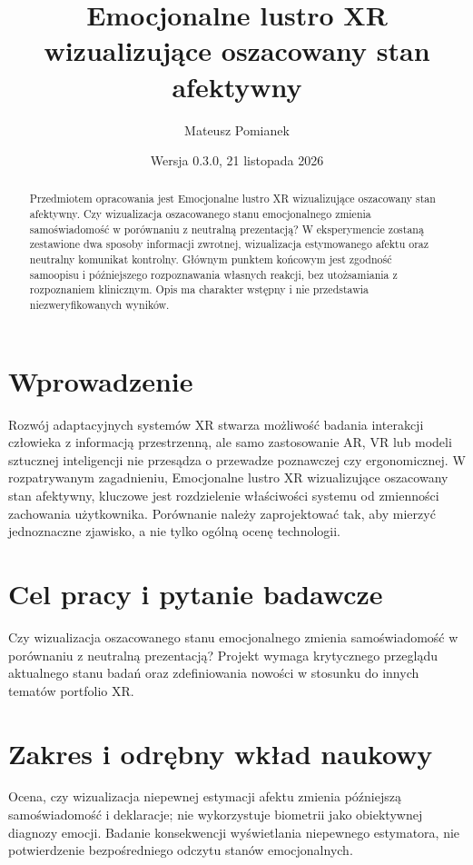 \documentclass[11pt,a4paper]{article}
\title{Emocjonalne lustro XR wizualizujące oszacowany stan afektywny}
\author{Mateusz Pomianek}
\date{Wersja 0.3.0, 21 listopada 2026}
\begin{document}
\maketitle

\begin{abstract}

Przedmiotem opracowania jest Emocjonalne lustro XR wizualizujące oszacowany stan afektywny. Czy wizualizacja oszacowanego stanu emocjonalnego zmienia samoświadomość w porównaniu z neutralną prezentacją? W eksperymencie zostaną zestawione dwa sposoby informacji zwrotnej, wizualizacja estymowanego afektu oraz neutralny komunikat kontrolny. Głównym punktem końcowym jest zgodność samoopisu i późniejszego rozpoznawania własnych reakcji, bez utożsamiania z rozpoznaniem klinicznym. Opis ma charakter wstępny i nie przedstawia niezweryfikowanych wyników.

\end{abstract}

\section{Wprowadzenie}

Rozwój adaptacyjnych systemów XR stwarza możliwość badania interakcji człowieka z informacją przestrzenną, ale samo zastosowanie AR, VR lub modeli sztucznej inteligencji nie przesądza o przewadze poznawczej czy ergonomicznej. W rozpatrywanym zagadnieniu, Emocjonalne lustro XR wizualizujące oszacowany stan afektywny, kluczowe jest rozdzielenie właściwości systemu od zmienności zachowania użytkownika. Porównanie należy zaprojektować tak, aby mierzyć jednoznaczne zjawisko, a nie tylko ogólną ocenę technologii.

\section{Cel pracy i pytanie badawcze}

Czy wizualizacja oszacowanego stanu emocjonalnego zmienia samoświadomość w porównaniu z neutralną prezentacją? Projekt wymaga krytycznego przeglądu aktualnego stanu badań oraz zdefiniowania nowości w stosunku do innych tematów portfolio XR.

\section{Zakres i odrębny wkład naukowy}
Ocena, czy wizualizacja niepewnej estymacji afektu zmienia późniejszą samoświadomość i deklaracje; nie wykorzystuje biometrii jako obiektywnej diagnozy emocji. Badanie konsekwencji wyświetlania niepewnego estymatora, nie potwierdzenie bezpośredniego odczytu stanów emocjonalnych.
\end{document}
